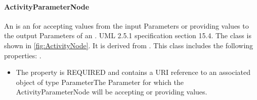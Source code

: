 \paragraph{ActivityParameterNode}%
\label{sec:uml:ActivityParameterNode}%
An  is an  for accepting values from the input Parameters or providing values to the output Parameters of an . UML 2.5.1 specification section 15.4.%
\newline%
\linebreak%
The  class is shown in \ref{fig:ActivityNode}. It is derived from .%
This class includes the following properties: . %
\begin{itemize}%
\item%
The  property is REQUIRED and contains a URI reference to an associated object of type ParameterThe Parameter for which the ActivityParameterNode will be accepting or providing values.%
\end{itemize}%
